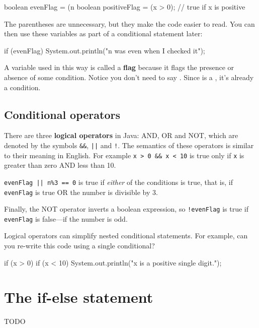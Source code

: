 \documentclass[12pt]{book}
\begin{document}
\begin{code}
    boolean evenFlag = (n %
    boolean positiveFlag = (x > 0);     // true if x is positive
\end{code}

The parentheses are unnecessary, but they make the code easier to read.
You can then use these variables as part of a conditional statement later:

\begin{code}
    if (evenFlag) {
        System.out.println("n was even when I checked it");
    }
\end{code}

A variable used in this way is called a {\bf flag} because it flags the presence or absence of some condition.
Notice you don't need to say .
Since  is a , it's already a condition.

\subsection{Conditional operators}


There are three {\bf logical operators} in Java: AND, OR and NOT, which are denoted by the symbols {\tt \&\&}, {\tt ||} and {\tt !}.
The semantics of these operators is similar to their meaning in English.
For example {\tt x > 0 \&\& x < 10} is true only if {\tt x} is greater than zero AND less than 10.


{\tt evenFlag || n\%3 == 0} is true if {\em either} of the conditions is true, that is, if {\tt evenFlag} is true OR the number is divisible by 3.

Finally, the NOT operator inverts a boolean expression, so {\tt !evenFlag} is true if {\tt evenFlag} is false---if the number is odd.


Logical operators can simplify nested conditional statements.
For example, can you re-write this code using a single conditional?

\begin{code}
    if (x > 0) {
        if (x < 10) {
            System.out.println("x is a positive single digit.");
        }
    }
\end{code}


\section{The if-else statement}
TODO
\end{document}
